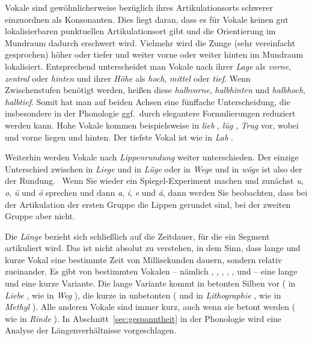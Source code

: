 Vokale sind gewöhnlicherweise bezüglich ihres Artikulationsorts schwerer einzuordnen als Konsonanten.
Dies liegt daran, dass es für Vokale keinen gut lokalisierbaren punktuellen Artikulationsort gibt und die Orientierung im Mundraum dadurch erschwert wird.
Vielmehr wird die Zunge (sehr vereinfacht gesprochen) höher oder tiefer und weiter vorne oder weiter hinten im Mundraum lokalisiert.
Entsprechend unterscheidet man Vokale nach ihrer \textit{Lage} als \textit{vorne}, \textit{zentral} oder \textit{hinten} und ihrer \textit{Höhe} als \textit{hoch}, \textit{mittel} oder \textit{tief}.
Wenn Zwischenstufen benötigt werden, heißen diese \textit{halbvorne}, \textit{halbhinten} und \textit{halbhoch}, \textit{halbtief}.
Somit hat man auf beiden Achsen eine fünffache Unterscheidung, die insbesondere in der Phonologie ggf.\ durch elegantere Formulierungen reduziert werden kann.
Hohe Vokale kommen beispielsweise in \textit{lieb} \textipa{[li:p]}, \textit{lüg} \textipa{[ly:k]}, \textit{Trug} \textipa{[tKu:k]} vor, wobei \textipa{[i]} und \textipa{[y]} vorne liegen und \textipa{[u]} hinten.
Der tiefste Vokal ist \textipa{[a]} wie in \textit{Lab} \textipa{[la:p]}.

Weiterhin werden Vokale nach \textit{Lippenrundung} weiter unterschieden.
Der einzige Unterschied zwischen \textipa{[i]} in \textit{Liege} \textipa{[li:g@]} und \textipa{[y]} in \textit{Lüge} \textipa{[ly:g@]} oder \textipa{[e]} in \textit{Wege} \textipa{[ve:g@]} und \textipa{[\o]} in \textit{wöge} \textipa{[v\o:g@]} ist also der der Rundung.
\TuBegin~Wenn Sie wieder ein Spiegel-Experiment machen und zunächst \textit{u}, \textit{o}, \textit{ü} und \textit{ö} sprechen und dann \textit{a}, \textit{i}, \textit{e} und \textit{ä}, dann werden Sie beobachten, dass bei der Artikulation der ersten Gruppe die Lippen gerundet sind, bei der zweiten Gruppe aber nicht.

Die \textit{Länge} bezieht sich schließlich auf die Zeitdauer, für die ein Segment artikuliert wird.
Das ist nicht absolut zu verstehen, in dem Sinn, dass lange und kurze Vokal eine bestimmte Zeit von Millisekunden dauern, sondern relativ zueinander.
Es gibt von bestimmten Vokalen -- nämlich \textipa{[i]}, \textipa{[y]}, \textipa{[u]}, \textipa{[e]}, \textipa{[\o]}, \textipa{[o]} und \textipa{[a]} -- eine lange und eine kurze Variante.
Die lange Variante kommt in betonten Silben vor (\textipa{[i:]} in \textit{Liebe} \textipa{[li:b@]}, \textipa{[e:]} wie in \textit{Weg} \textipa{[ve:k]}), die kurze in unbetonten (\textipa{[i]} und \textipa{[o]} in \textit{Lithographie} \textipa{[litogKafi:]}, \textipa{[e]} wie in \textit{Methyl} \textipa{[mety:l]}).
Alle anderen Vokale sind immer kurz, auch wenn sie betont werden (\textipa{[I]} wie in \textit{Rinde} \textipa{[KInd@]}).
In Abschnitt~\ref{sec:gespanntheit} in der Phonologie wird eine Analyse der Längenverhältnisse vorgeschlagen.

